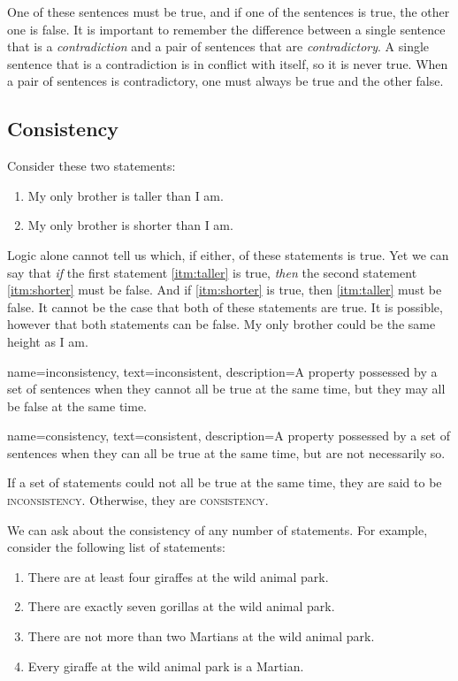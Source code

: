 One of these sentences must be true, and if one of the sentences is true, the other one is false. It is important to remember the difference between a single sentence that is a \emph{contradiction} and a pair of sentences that are \emph{contradictory}. A single sentence that is a contradiction is in conflict with itself, so it is never true. When a pair of sentences is contradictory, one must always be true and the other false.


\subsection{Consistency}
Consider these two statements:

\begin{enumerate}[label=(\alph*)]
\item \label{itm:taller} My only brother is taller than I am.
\item \label{itm:shorter} My only brother is shorter than I am.
\end{enumerate}

Logic alone cannot tell us which, if either, of these statements is true. Yet we can say that \emph{if} the first statement \ref{itm:taller} is true, \emph{then} the second statement \ref{itm:shorter} must be false. And if \ref{itm:shorter}  is true, then \ref{itm:taller} must be false. It cannot be the case that both of these statements are true. It is possible, however that both statements can be false. My only brother could be the same height as I am.

{
name=inconsistency,
text={inconsistent},
description={A property possessed by a set of sentences when they cannot all be true at the same time, but they may all be false at the same time.}
}

{
name=consistency,
text={consistent},
description={A property possessed by a set of sentences when they can all be true at the same time, but are not necessarily so.}
}

If a set of statements could not all be true at the same time, they are said to be \textsc{\gls{inconsistency}}. \label{def:inconsistency} Otherwise, they are \textsc{\gls{consistency}}. \label{def:consistency}

We can ask about the consistency of any number of statements. For example, consider the following list of statements:

\label{MartianGiraffes}
\begin{enumerate}[label=(\alph*)]
\item \label{itm:at_least_four}There are at least four giraffes at the wild animal park.
\item \label{itm:exactly_seven} There are exactly seven gorillas at the wild animal park.
\item \label{itm:not_more_than_two} There are not more than two Martians at the wild animal park.
\item \label{itm:martians} Every giraffe at the wild animal park is a Martian.
\end{enumerate}

